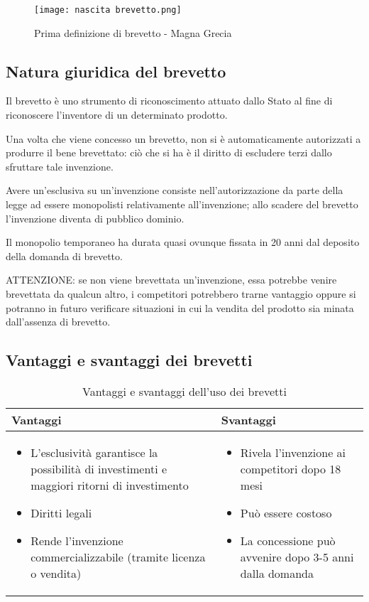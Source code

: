 \begin{figure}
    \centering
    \texttt{[image: nascita brevetto.png]}
    \caption{Prima definizione di brevetto - Magna Grecia}
\end{figure}

\subsection{Natura giuridica del brevetto}
Il brevetto è uno strumento di riconoscimento attuato dallo Stato al fine di riconoscere l'inventore di un determinato prodotto.\bigskip

Una volta che viene concesso un brevetto, non si è automaticamente autorizzati a produrre il bene brevettato: ciò che si ha è il diritto di escludere terzi dallo sfruttare tale invenzione. 

Avere un'esclusiva su un'invenzione consiste nell'autorizzazione da parte della legge ad essere monopolisti relativamente all'invenzione; allo scadere del brevetto l'invenzione diventa di pubblico dominio.

Il monopolio temporaneo ha durata quasi ovunque fissata in 20 anni dal deposito della domanda di brevetto.\bigskip

ATTENZIONE: se non viene brevettata un'invenzione, essa potrebbe venire brevettata da qualcun altro, i competitori potrebbero trarne vantaggio oppure si potranno in futuro verificare situazioni in cui la vendita del prodotto sia minata dall'assenza di brevetto. 

\subsection{Vantaggi e svantaggi dei brevetti}
\begin{table}[h]
    \centering
    \begin{tabular}{|p{6.5cm}|p{6.5cm}|}
        \hline
        Vantaggi & Svantaggi \\
        \hline
        \begin{itemize}
            \item L'esclusività garantisce la possibilità di investimenti e maggiori ritorni di investimento
            \item Diritti legali
            \item Rende l'invenzione commercializzabile (tramite licenza o vendita)
        \end{itemize} & \begin{itemize}
            \item Rivela l'invenzione ai competitori dopo 18 mesi 
            \item Può essere costoso
            \item La concessione può avvenire dopo 3-5 anni dalla domanda
        \end{itemize}\\
        \hline
    \end{tabular}
    \caption{Vantaggi e svantaggi dell'uso dei brevetti}
\end{table}

